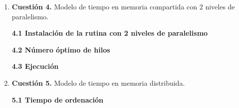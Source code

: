 \documentclass[12pt]{article}
\begin{document}
\begin{enumerate}
El problema es que la ecuación~1 supone que, con el doble de hilos, el trabajo se hace en la mitad de tiempo, y en este ordenador no pasa. En los tres casos, con muchos hilos el tiempo se queda más o menos en la mitad del tiempo con 1 hilo (2.02 frente a 3.51, 3.46 frente a 6.93 y 5.29 frente a 10.90). Si el límite fuera que no hay individuos para todos los hilos, cada hilo haría un individuo y el tiempo sería el mismo para cualquier NE, pero no es así: sigue creciendo con NE. Lo que limita es la memoria. Para calcular el fitness de un individuo hay que leer unos 128 millones de distancias de una matriz de 3.6 GB, saltando de una posición a otra. Esos datos casi nunca están en la caché, así que hay que ir a buscarlos a la memoria principal, y a partir de unos 4 hilos la memoria no da abasto para atender a más. Además, en un portátil el procesador baja la frecuencia cuando trabajan todos los núcleos a la vez. El modelo no tiene en cuenta nada de esto, como ya avisa el enunciado, y con una sola constante $k_h$ no puede reproducirlo.

\newpage
\item \textbf{Cuestión 4.} Modelo de tiempo en memoria compartida con 2 niveles de paralelismo.


\medskip
\noindent\textbf{4.1 Instalación de la rutina con 2 niveles de paralelismo}\par
\smallskip


\medskip
\noindent\textbf{4.2 Número óptimo de hilos}\par
\smallskip


\medskip
\noindent\textbf{4.3 Ejecución}\par
\smallskip



\newpage
\item \textbf{Cuestión 5.} Modelo de tiempo en memoria distribuida.


\medskip
\noindent\textbf{5.1 Tiempo de ordenación}\par
\smallskip



\end{enumerate}
\end{document}
